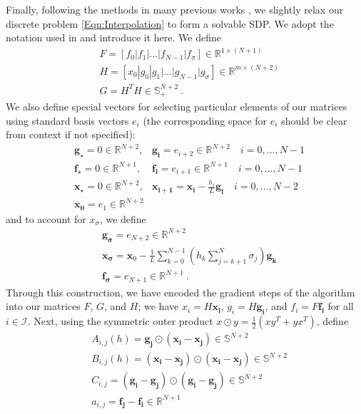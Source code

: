 \documentclass[11pt]{article}
\numberwithin{equation}{section}
\newcommand{\R}{\mathbb{R}}
\theoremstyle{definition}
\theoremstyle{definition}
\theoremstyle{definition}
\newcommand{\1}{\mathbf{1}}
\newcommand{\xStar}{x_\star}
\newcommand{\xSpecial}{x_\sigma}
\newcommand{\fSpecial}{f_\sigma}
\newcommand{\gSpecial}{g_\sigma}
\newcommand{\dimension}{m}
\begin{document}
Finally, following the methods in many previous works \cite{Drori2019,Interpolation,Interpolation2}, we slightly relax our discrete problem \eqref{Eqn:Interpolation} to form a solvable SDP. We adopt the notation used in \cite{BnB} and introduce it here. We define
\begin{align*}
    & F = [f_0|f_1|\dots|f_{N-1}|\fSpecial] \in \R^{1 \times(N+1)} \\
    & H = [x_0|g_0|g_1|\dots|g_{N-1}|\gSpecial] \in \R^{\dimension \times(N+2)} \\
    & G = H^T H \in \mathbb{S}_+^{N+2} \ .
\end{align*}
We also define special vectors for selecting particular elements of our matrices using standard basis vectors $e_i$ (the corresponding space for $e_i$ should be clear from context if not specified):
\begin{align*}
    & \mathbf{g_\star} = 0 \in \R^{N+2}, & \mathbf{g_i} = e_{i+2} \in \R^{N+2} \quad i=0,\dots, N-1 \\
    & \mathbf{f_\star} = 0 \in \R^{N+1}, & \mathbf{f_i} = e_{i+1} \in \R^{N+1} \quad i=0,\dots, N-1 \\
    & \mathbf{\xStar} = 0 \in \R^{N+2}, & \mathbf{x_{i+1}} = \mathbf{x_i}-\frac{h_i}{L}\mathbf{g_i} \quad  i=0,\dots,N-2 \\
    & \mathbf{x_0} = e_1 \in \R^{N+2}
\end{align*}
and to account for $\xSpecial$, we define
\begin{align*}
    & \mathbf{g_\sigma} = e_{N+2} \in \R^{N+2} \\
    & \mathbf{x_\sigma} = \mathbf{x}_0 - \frac{1}{L} \sum_{k=0}^{N-1} \left(h_k \sum_{j=k+1}^N \sigma_j\right) \mathbf{g_k} \\
    & \mathbf{f_\sigma} = e_{N+1} \in \R^{N+1} \ .
\end{align*}
Through this construction, we have encoded the gradient steps of the algorithm into our matrices $F$, $G$, and $H$; we have $x_i=H\mathbf{x_i}$, $g_i = H\mathbf{g_i}$, and $f_i = F\mathbf{f_i}$ for all $i \in \mathcal{I}$. Next, using the symmetric outer product $x \odot y = \frac{1}{2}(xy^T + yx^T)$, define
\begin{align*}
    & A_{i,j}(h) = \mathbf{g_j} \odot (\mathbf{x_i} - \mathbf{x_j}) \in \mathbb{S}^{N+2} \\
    & B_{i,j}(h) = (\mathbf{x_i} - \mathbf{x_j})\odot(\mathbf{x_i} - \mathbf{x_j}) \in \mathbb{S}^{N+2}\\
    & C_{i,j} = (\mathbf{g_i} - \mathbf{g_j})\odot (\mathbf{g_i} - \mathbf{g_j}) \in \mathbb{S}^{N+2}\\
    & a_{i,j} = \mathbf{f_j} - \mathbf{f_i} \in \R^{N+1}
\end{align*}
\end{document}
